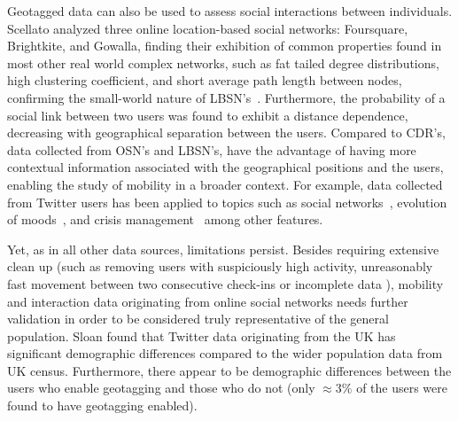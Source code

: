 Geotagged data can also be used to assess social interactions between individuals. Scellato \et\cite{scellato_2011_socio} analyzed three online location-based social networks: Foursquare, Brightkite, and Gowalla, finding their exhibition of common properties found in most other real world complex networks, such as fat tailed degree distributions, high clustering coefficient, and short average path length between nodes, confirming the small-world nature of LBSN's~\cite{Newman_book}. Furthermore, the probability of a social link  between two users was found to exhibit a distance dependence, decreasing with geographical separation between the users.
Compared to CDR's, data collected from OSN's and LBSN's, have the advantage of having more contextual information associated with the geographical positions and the users, enabling the study of mobility in a broader context. For example, data collected from Twitter users has been applied to topics such as social networks~\cite{java_2007_why, huberman_2008_social, kwak_2010_what}, evolution of moods~\cite{pak_2010_twitter, bollen_2011_modeling, golder_2011_diurnal}, and crisis management~\cite{sakaki_2010_earthquake,maceachren_2011_senseplace2, thom_2012_spatiotemporal} among other features.

Yet, as in all other data sources, limitations persist. Besides requiring extensive clean up (such as removing users with suspiciously high activity, unreasonably fast movement between two consecutive check-ins or incomplete data \cite{hawelka_2014_geo}), mobility and interaction data originating from online social networks needs further validation in order to be considered truly representative of the general population. Sloan \et\cite{sloan_2015_tweets} found that Twitter data originating from the UK has significant demographic differences compared to the wider population data from UK census. Furthermore, there appear to be demographic differences between the users who enable geotagging and those who do not (only $\approx 3\%$ of the users were found to have geotagging enabled).

